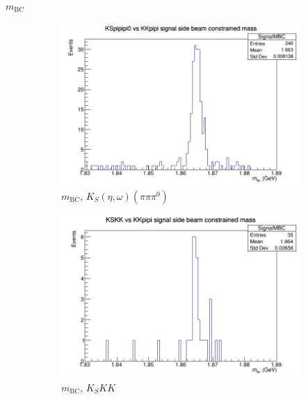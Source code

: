 \documentclass{beamer}
\begin{document}
\begin{frame}{$m_\text{BC}$}
  \begin{figure}
    \centering
    \begin{subfigure}{0.4\textwidth}
      \centering
      \includegraphics[width=\textwidth]{KSpipipi0SignalMBC.png}
      \caption{$m_\text{BC}$, $K_S(\eta, \omega)(\pi\pi\pi^0)$}
    \end{subfigure}%
    \begin{subfigure}{0.4\textwidth}
      \centering
      \includegraphics[width=\textwidth]{KSKKSignalMBC.png}
      \caption{$m_\text{BC}$, $K_SKK$}
    \end{subfigure}
    \centering
    \begin{subfigure}{0.4\textwidth}
      \centering

\end{subfigure}
\end{figure}
\end{frame}
\end{document}
